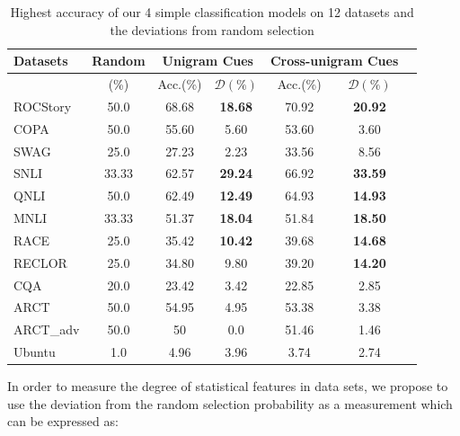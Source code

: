 \begin{table}[th]
\scriptsize
\centering
\begin{tabular}{p{7mm}cccccc}\hline
\textbf{Datasets} &Random & \multicolumn{2}{c}{Unigram Cues} &  \multicolumn{2}{c}{Cross-unigram Cues} \\ \hline
                                     & (\%)                 &  Acc.(\%) & $\mathcal{D}(\%)$&  Acc.(\%) & $\mathcal{D}(\%) $ \\ \hline         
ROCStory & 50.0            & 68.68          & \textbf{18.68}                    &70.92          & \textbf{20.92}\\
COPA        & 50.0           & 55.60           &  5.60                   &53.60          & 3.60 \\
SWAG       & 25.0           & 27.23           &   2.23                  &33.56          & 8.56\\
SNLI          & 33.33      & 62.57           &  \textbf{29.24}                  &66.92         & \textbf{33.59}\\
QNLI         & 50.0           & 62.49            &  \textbf{12.49}                 &64.93          &\textbf{14.93}\\
MNLI         & 33.33      & 51.37            &\textbf{18.04}                 &51.84          & \textbf{18.50} \\
RACE        & 25.0          & 35.42            &   \textbf{10.42}                 &39.68          &\textbf{14.68}\\
RECLOR       & 25.0           & 34.80            &   9.80                  &39.20           &\textbf{14.20}\\
CQA          &20.0            & 23.42            &  3.42                   &22.85           &  2.85\\
ARCT        & 50.0            & 54.95           &  4.95                  & 53.38          & 3.38\\
ARCT\_adv& 50.0           &50                 &0.0                     & 51.46            & 1.46 \\
Ubuntu   & 1.0               &4.96              &3.96                     &3.74          &2.74\\
\hline
\end{tabular}
\caption{\label{best_acc} Highest accuracy of our 4 simple classification models
on 12 datasets and the deviations from random selection}
\end{table}

In order to measure the degree of statistical features in data sets, we propose to use the 
deviation from the random selection probability as a measurement which can be expressed as:

